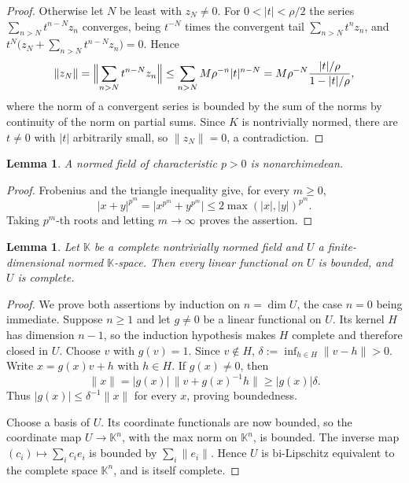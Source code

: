\documentclass[11pt]{amsart}
\newtheorem{lemma}[theorem]{Lemma}
\theoremstyle{definition}
\theoremstyle{remark}
\numberwithin{equation}{section}
\newcommand{\abs}[1]{\lvert #1\rvert}
\newcommand{\norm}[1]{\lVert #1\rVert}
\theoremstyle{plain}
\theoremstyle{definition}
\theoremstyle{plain}
\begin{document}
\begin{proof}
Otherwise let $N$ be least with $z_N\neq0$. For $0<\abs t<\rho/2$ the series $\sum_{n>N}t^{n-N}z_n$ converges, being
$t^{-N}$ times the convergent tail $\sum_{n>N}t^nz_n$, and $t^N\bigl(z_N+\sum_{n>N}t^{n-N}z_n\bigr)=0$. Hence
\[
\norm{z_N}=\Bigl\lVert\sum_{n>N}t^{n-N}z_n\Bigr\rVert\le\sum_{n>N}M\rho^{-n}\abs t^{n-N}
=M\rho^{-N}\frac{\abs t/\rho}{1-\abs t/\rho},
\]
where the norm of a convergent series is bounded by the sum of the norms by continuity of the norm on partial sums.
Since $K$ is nontrivially normed, there are $t\ne0$ with $\abs t$ arbitrarily small, so $\norm{z_N}=0$, a
contradiction.
\end{proof}

\begin{lemma}\label{lem:ultra}
A normed field of characteristic $p>0$ is nonarchimedean.
\end{lemma}

\begin{proof}
Frobenius and the triangle inequality give, for every $m\ge0$,
\[
 \abs{x+y}^{p^m}=\abs{x^{p^m}+y^{p^m}}
 \le2\max(\abs x,\abs y)^{p^m}.
\]
Taking $p^m$\nobreakdash-th roots and letting $m\to\infty$ proves the assertion.
\end{proof}

\begin{lemma}\label{lem:findim}
Let $\mathbb K$ be a complete nontrivially normed field and $U$ a finite-dimensional normed $\mathbb K$\nobreakdash-space. Then every
linear functional on $U$ is bounded, and $U$ is complete.
\end{lemma}

\begin{proof}
We prove both assertions by induction on $n=\dim U$, the case $n=0$ being immediate. Suppose $n\ge1$ and let $g\ne0$
be a linear functional on $U$. Its kernel $H$ has dimension $n-1$, so the induction hypothesis makes $H$ complete
and therefore closed in $U$. Choose $v$ with $g(v)=1$. Since $v\notin H$,
$\delta:=\inf_{h\in H}\norm{v-h}>0$. Write $x=g(x)v+h$ with $h\in H$. If $g(x)\ne0$, then
\[
\norm x=\abs{g(x)}\,\norm{v+g(x)^{-1}h}\ge\abs{g(x)}\delta.
\]
Thus $\abs{g(x)}\le\delta^{-1}\norm x$ for every $x$, proving boundedness.

Choose a basis of $U$. Its coordinate functionals are now bounded, so the coordinate map
$U\to\mathbb K^n$, with the max norm on $\mathbb K^n$, is bounded. The inverse map
$(c_i)\mapsto\sum_ic_ie_i$ is bounded by $\sum_i\norm{e_i}$. Hence $U$ is bi-Lipschitz equivalent to the complete
space $\mathbb K^n$, and is itself complete.
\end{proof}
\end{document}

